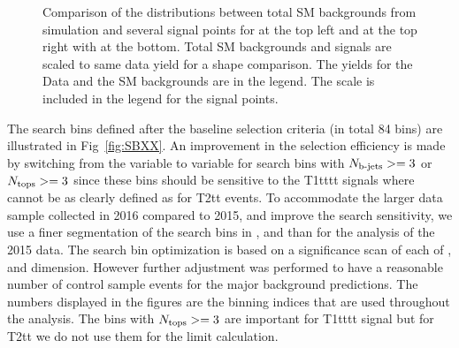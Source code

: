 \begin{figure}[h]
\begin{center}
    \caption{Comparison of the distributions between total SM backgrounds from simulation and several signal points for \MET at the top left and \MTTwo at the top right with \HT at the bottom. Total SM backgrounds and signals are scaled to same data yield for a shape comparison. The yields for the Data and the SM backgrounds are in the legend.  The scale is included in the legend for the signal points. }
    \label{fig:compSBvars2}
  \end{center}
\end{figure}

The search bins defined after the baseline selection criteria (in total 84 bins) are illustrated in Fig~\ref{fig:SBXX}. An improvement in the selection efficiency is made by switching from the \MTTwo variable to \HT variable for search bins with $N_{\text{b-jets}}>=3$ or $N_{\text{tops}}>=3$ since these bins should be sensitive to the T1tttt signals where \MTTwo cannot be as clearly defined as for T2tt events.
To accommodate the larger data sample collected in 2016 compared to 2015, and improve the search sensitivity, we use a finer segmentation of the search bins in
\MET, \HT and \MTTwo than for the analysis of the 2015 data. The search bin optimization is based on a significance scan of each of \MET, \MTTwo and \HT dimension. However
further adjustment was performed to have a reasonable number of control sample events for the major background predictions.
The numbers displayed in the figures are the binning indices that are used throughout the analysis.
The bins with $N_{\text{tops}}>=3$ are important for T1tttt signal but for T2tt we do not use them for the limit calculation.

